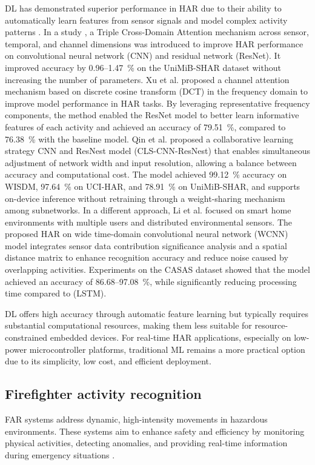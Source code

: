 \documentclass[journal,twoside,web]{ieeecolor}
\begin{document}
DL has demonstrated superior performance in HAR due to their ability to automatically learn features from sensor signals and model complex activity patterns \cite{DL2021_HAR_wearable}. In a study \cite{HAR_CNN_2022}, a Triple Cross-Domain Attention mechanism across sensor, temporal, and channel dimensions was introduced to improve HAR performance on convolutional neural network (CNN) and residual network (ResNet). It improved accuracy by 0.96–1.47~\% on the UniMiB-SHAR dataset without increasing the number of parameters. Xu et al. \cite{HAR_DCT_deeplearning2023} proposed a channel attention mechanism based on discrete cosine transform (DCT) in the frequency domain to improve model performance in HAR tasks. By leveraging representative frequency components, the method enabled the ResNet model to better learn informative features of each activity and achieved an accuracy of 79.51~\%, compared to 76.38~\% with the baseline model. Qin et al. \cite{HAR_CNN_2024} proposed a collaborative learning strategy CNN and ResNest model (CLS-CNN-ResNest) that enables simultaneous adjustment of network width and input resolution, allowing a balance between accuracy and computational cost. The model achieved 99.12~\% accuracy on WISDM, 97.64~\% on UCI-HAR, and 78.91~\% on UniMiB-SHAR, and supports on-device inference without retraining through a weight-sharing mechanism among subnetworks. In a different approach, Li et al. \cite{HAR_DL_sensor2023} focused on smart home environments with multiple users and distributed environmental sensors. The proposed HAR on wide time-domain convolutional neural network (WCNN) model integrates sensor data contribution significance analysis and a spatial distance matrix to enhance recognition accuracy and reduce noise caused by overlapping activities. Experiments on the CASAS dataset showed that the model achieved an accuracy of 86.68–97.08~\%, while significantly reducing processing time compared to (LSTM).

DL offers high accuracy through automatic feature learning but typically requires substantial computational resources, making them less suitable for resource-constrained embedded devices. For real-time HAR applications, especially on low-power microcontroller platforms, traditional ML remains a more practical option due to its simplicity, low cost, and efficient deployment.

\subsection{Firefighter activity recognition}
FAR systems address dynamic, high-intensity movements in hazardous environments. These systems aim to enhance safety and efficiency by monitoring physical activities, detecting anomalies, and providing real-time information during emergency situations \cite{Firefighterhealthcare2024,Thanhfire2019,wearableFirefirefighter2015,wearableFirefirefighter2018}.
\end{document}
